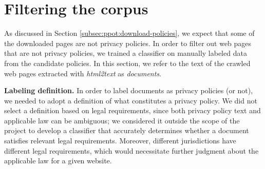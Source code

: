 \section{Filtering the corpus}
\label{sec:ppot:classifier}

As discussed in Section \ref{subsec:ppot:download-policies}, we expect that some of the downloaded pages are not privacy policies. In order to filter out web pages that are not privacy policies, we trained a classifier on manually labeled data from the candidate policies. In this section, we refer to the text of the crawled web pages extracted with \emph{html2text} as \textit{documents}.

\textbf{Labeling definition.}
\label{subsec:ppot:pp-definition}
In order to label documents as privacy policies (or not), we needed to adopt a definition of what constitutes a privacy policy. We did not select a definition based on legal requirements, since both privacy policy text and applicable law can be ambiguous; we considered it outside the scope of the project to develop a classifier that accurately determines whether a document satisfies relevant legal requirements. Moreover, different jurisdictions have different legal requirements, which would necessitate further judgment about the applicable law for a given website.

